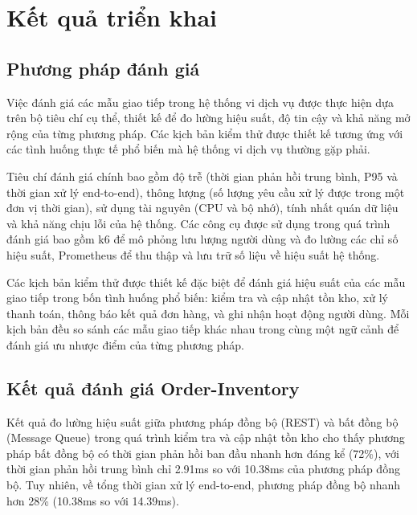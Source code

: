\section{Kết quả triển khai}

\subsection{Phương pháp đánh giá}
Việc đánh giá các mẫu giao tiếp trong hệ thống vi dịch vụ được thực hiện dựa trên bộ tiêu chí cụ thể, thiết kế để đo lường hiệu suất, độ tin cậy và khả năng mở rộng của từng phương pháp. Các kịch bản kiểm thử được thiết kế tương ứng với các tình huống thực tế phổ biến mà hệ thống vi dịch vụ thường gặp phải.

Tiêu chí đánh giá chính bao gồm độ trễ (thời gian phản hồi trung bình, P95 và thời gian xử lý end-to-end), thông lượng (số lượng yêu cầu xử lý được trong một đơn vị thời gian), sử dụng tài nguyên (CPU và bộ nhớ), tính nhất quán dữ liệu và khả năng chịu lỗi của hệ thống. Các công cụ được sử dụng trong quá trình đánh giá bao gồm k6 để mô phỏng lưu lượng người dùng và đo lường các chỉ số hiệu suất, Prometheus để thu thập và lưu trữ số liệu về hiệu suất hệ thống.

Các kịch bản kiểm thử được thiết kế đặc biệt để đánh giá hiệu suất của các mẫu giao tiếp trong bốn tình huống phổ biến: kiểm tra và cập nhật tồn kho, xử lý thanh toán, thông báo kết quả đơn hàng, và ghi nhận hoạt động người dùng. Mỗi kịch bản đều so sánh các mẫu giao tiếp khác nhau trong cùng một ngữ cảnh để đánh giá ưu nhược điểm của từng phương pháp.

\subsection{Kết quả đánh giá Order-Inventory}
Kết quả đo lường hiệu suất giữa phương pháp đồng bộ (REST) và bất đồng bộ (Message Queue) trong quá trình kiểm tra và cập nhật tồn kho cho thấy phương pháp bất đồng bộ có thời gian phản hồi ban đầu nhanh hơn đáng kể (72\%), với thời gian phản hồi trung bình chỉ 2.91ms so với 10.38ms của phương pháp đồng bộ. Tuy nhiên, về tổng thời gian xử lý end-to-end, phương pháp đồng bộ nhanh hơn 28\% (10.38ms so với 14.39ms).

